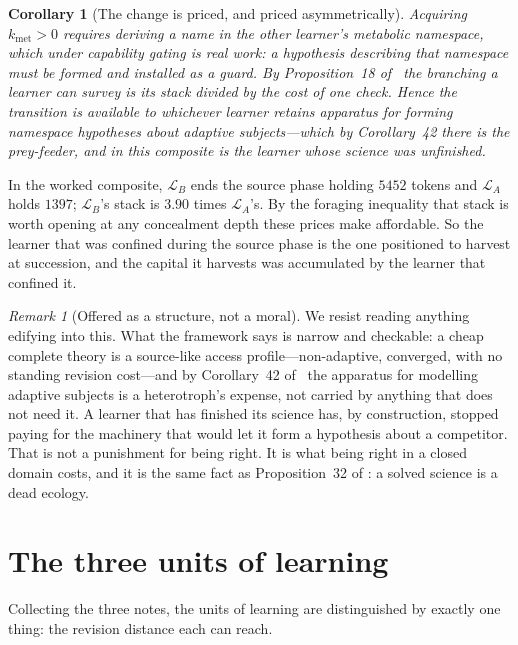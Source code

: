 \documentclass[11pt,a4paper]{article}
\theoremstyle{plain}
\newtheorem{corollary}[theorem]{Corollary}
\theoremstyle{definition}
\theoremstyle{remark}
\newtheorem{remark}[theorem]{Remark}
\newcommand{\Lrn}{\mathcal{L}}
\begin{document}
\begin{corollary}[The change is priced, and priced asymmetrically]
Acquiring $k_{\mathrm{met}} > 0$ requires deriving a name in the other learner's metabolic
namespace, which under capability gating is real work: a hypothesis describing that namespace
must be formed and installed as a guard. By Proposition~18 of~\cite{scientist} the branching a
learner can survey is its stack divided by the cost of one check. Hence the transition is
available to whichever learner retains apparatus for forming namespace hypotheses about adaptive
subjects---which by Corollary~42 there is the prey-feeder, and in this composite is the learner
whose science was unfinished.
\end{corollary}

In the worked composite, $\Lrn_B$ ends the source phase holding $5452$ tokens and $\Lrn_A$ holds
$1397$; $\Lrn_B$'s stack is $3.90$ times $\Lrn_A$'s. By the foraging inequality that stack is
worth opening at any concealment depth these prices make affordable. So the learner that was
confined during the source phase is the one positioned to harvest at succession, and the capital
it harvests was accumulated by the learner that confined it.

\begin{remark}[Offered as a structure, not a moral]
We resist reading anything edifying into this. What the framework says is narrow and checkable:
a cheap complete theory is a source-like access profile---non-adaptive, converged, with no
standing revision cost---and by Corollary~42 of~\cite{scientist} the apparatus for modelling
adaptive subjects is a heterotroph's expense, not carried by anything that does not need it. A
learner that has finished its science has, by construction, stopped paying for the machinery that
would let it form a hypothesis about a competitor. That is not a punishment for being right. It
is what being right in a closed domain costs, and it is the same fact as Proposition~32 of
\cite{game}: a solved science is a dead ecology.
\end{remark}

\section{The three units of learning}\label{sec:units}

Collecting the three notes, the units of learning are distinguished by exactly one thing: the
revision distance each can reach.
\end{document}

